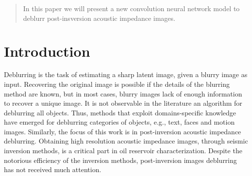 \documentclass[conference,compsoc]{IEEEtran}
\begin{document}




\maketitle

\begin{abstract}
In this paper we will present a new convolution neural network
model to deblurr post-insversion acoustic impedance images.

\end{abstract}





%
\IEEEpeerreviewmaketitle

\section{Introduction}
Deblurring is the task of estimating a sharp latent image,
given a blurry image as input. Recovering the original image
is possible if the details of the blurring method are known, but
in most cases, blurry images lack of enough information
to recover a unique image. It is not observable in the literature
an algorithm for deblurring all objects. Thus, methods that exploit
domains-specific knowledge have emerged for deblurring
categories of objects, e.g., text, faces and motion images. Similarly,
the focus of this work is in post-inversion acoustic impedance deblurring.
Obtaining high resolution acoustic impedance images, through seismic inversion methods,
is a critical part in oil reservoir characterization.
Despite the notorious efficiency of the inversion methods,
post-inversion images deblurring has not received much attention.
\end{document}

